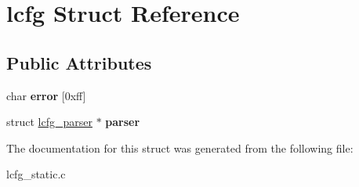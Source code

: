 \hypertarget{structlcfg}{\section{lcfg Struct Reference}
\label{structlcfg}
}
\subsection*{Public Attributes}
\begin{DoxyCompactItemize}
\item 
\hypertarget{structlcfg_a85ae9529e15e58a116ba52bced27f548}{char {\bfseries error} \mbox{[}0xff\mbox{]}}\label{structlcfg_a85ae9529e15e58a116ba52bced27f548}

\item 
\hypertarget{structlcfg_a628a554c42296771f9ff81c69d677ce3}{struct \hyperlink{structlcfg__parser}{lcfg\+\_\+parser} $\ast$ {\bfseries parser}}\label{structlcfg_a628a554c42296771f9ff81c69d677ce3}

\end{DoxyCompactItemize}


The documentation for this struct was generated from the following file\+:\begin{DoxyCompactItemize}
\item 
lcfg\+\_\+static.\+c\end{DoxyCompactItemize}
